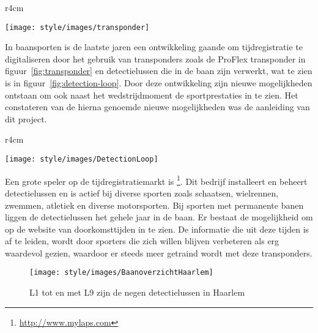 \newcommand{\aanleiding}{}

\begin{wrapfigure}{r}{4cm}
  \begin{center}
    \texttt{[image: style/images/transponder]}
  \end{center}
  \caption{MyLaps ProFlex transponder, op schaal}
  \label{fig:transponder}
  \vspace{15mm}
\end{wrapfigure}

In baansporten is de laatste jaren een ontwikkeling gaande om tijdregistratie te digitaliseren door het gebruik van transponders zoals de \mylaps ProFlex transponder in figuur~\ref{fig:transponder} en detectielussen die in de baan zijn verwerkt, wat te zien is in figuur~\ref{fig:detection-loop}. Door deze ontwikkeling zijn nieuwe mogelijkheden ontstaan om ook naast het wedstrijdmoment de sportprestaties in te zien. Het constateren van de hierna genoemde nieuwe mogelijkheden was de aanleiding van dit project.

\begin{wrapfigure}{r}{4cm}
  \begin{center}
    \texttt{[image: style/images/DetectionLoop]}
  \end{center}
  \caption{Een schema van een detectielus en en decoder}
  \label{fig:detection-loop}
  \vspace{5mm}
\end{wrapfigure}

Een grote speler op de tijdregistratiemarkt is \mylaps\footnote{\url{http://www.mylaps.com}}. Dit bedrijf installeert en beheert detectielussen en is actief bij diverse sporten zoals schaatsen, wielrennen, zwemmen, atletiek en diverse motorsporten. Bij sporten met permanente banen liggen de detectielussen het gehele jaar in de baan. Er bestaat de mogelijkheid om op de website van \mylaps doorkomsttijden in te zien. De informatie die uit deze tijden is af te leiden, wordt door sporters die zich willen blijven verbeteren als erg waardevol gezien, waardoor er steeds meer getraind wordt met deze transponders.

\begin{figure}
  \begin{center}
    \texttt{[image: style/images/BaanoverzichtHaarlem]}
  \end{center}
  \caption{L1 tot en met L9 zijn de negen \mylaps detectielussen in Haarlem}
  \label{fig:track-transponders}
\end{figure}

